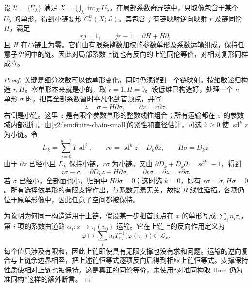 \begin{lemma}\label{g2:lem:twisted-small-chain-retraction}
	设 \(\mathcal U=\{U_\lambda\}\) 满足 \(X=\bigcup_\lambda\operatorname{int}_XU_\lambda\)。在局部系数奇异链中，只取像包含于某个 \(U_\lambda\) 的单形，得到小链复形 \(C_*^{\mathcal U}(X;\mathcal L)\)。其包含 \(j\) 有链映射逆向映射 \(r\) 及链同伦 \(H\)，满足
	\[
		rj=1,\qquad jr-1=\partial H+H\partial,
	\]
	且 \(H\) 在小链上为零。它们由有限条整数加权的参数单形及系数运输组成，保持任意子空间中的链。因此对局部系数上链也有反向的上链同伦等价，对相对复形同样成立。
\end{lemma}
\begin{proof}
	关键是细分次数可以依单形变化，同时仍须得到一个链映射。按维数递归构造 \(r,H\)。零单形本来就是小的，取 \(r=1,H=0\)。设低维已构造好，处理一个 \(n\) 单形 \(\sigma\) 时，把其全部系数暂时平凡化到首顶点，并写
	\[
		z=\sigma+H\partial\sigma,\qquad \partial z=r\partial\sigma.
	\]
	右侧是小链。这里 \(z\) 是有限个参数单形的整数线性组合；所有运输都在 \(\sigma\) 的参数域内部进行。由\cref{g2:lem:finite-chain-small}的紧性和直径估计，可选 \(k\ge0\) 使 \(\operatorname{sd}^kz\) 为小链。令
	\[
		D_k=\sum_{j=0}^{k-1}T\operatorname{sd}^{j},\qquad
		r\sigma=\operatorname{sd}^kz-D_k\partial z,\qquad H\sigma=D_kz.
	\]
	由于 \(\partial z\) 已经小且 \(D_k\) 保持小链，\(r\sigma\) 为小链。又由 \(\partial D_k+D_k\partial=\operatorname{sd}^k-1\)，得到
	\[
		r\sigma-\sigma=\partial D_kz+H\partial\sigma,
		\qquad \partial r\sigma=\partial z=r\partial\sigma.
	\]
	若 \(\sigma\) 已经小，全部面也小，归纳中 \(H\partial\sigma=0\)；这时选 \(k=0\)，即有 \(r\sigma=\sigma,H\sigma=0\)。所有选择依单形的有限支撑作出，与系数元素无关，故按 \(R\) 线性延拓。各项仍位于原单形像中，因此任意子空间都被保持。

	为说明为何同一构造适用于上链，假设某一步把首顶点在 \(x\) 的单形写成 \(\sum_i n_i\tau_i\)，第 \(i\) 项的系数由道路 \(\alpha_i:x\to\tau_i(v_0)\) 运输。它在上链上的反向作用定义为
	\[
		\varphi\longmapsto\sum_i n_iT_{\alpha_i}^{-1}\bigl(\varphi(\tau_i)\bigr)\in\mathcal L_x.
	\]
	每个值只涉及有限和，因此上链即使具有无限支撑也没有求和问题。运输的逆向复合与上链余边界相容，把上述链恒等式逐项反向后得到相应上链恒等式。支撑保持性质使相对上链也被保持。这是真正的同伦等价，未使用“对准同构取 Hom 仍为准同构”这样的额外断言。
\end{proof}

